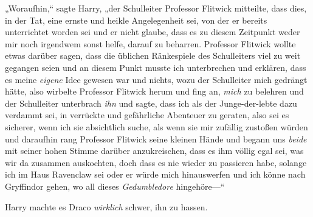 „Woraufhin,“ sagte Harry, „der Schulleiter Professor Flitwick mitteilte, dass dies, in der Tat, eine ernste und heikle Angelegenheit sei, von der er bereits unterrichtet worden sei und er nicht glaube, dass es zu diesem Zeitpunkt weder mir noch irgendwem sonst helfe, darauf zu beharren. Professor Flitwick wollte etwas darüber sagen, dass die üblichen Ränkespiele des Schulleiters viel zu weit gegangen seien und an diesem Punkt musste ich unterbrechen und erklären, dass es meine \emph{eigene} Idee gewesen war und nichts, wozu der Schulleiter mich gedrängt hätte, also wirbelte Professor Flitwick herum und fing an, \emph{mich} zu belehren und der Schulleiter unterbrach \emph{ihn} und sagte, dass ich als der Junge-der-lebte dazu verdammt sei, in verrückte und gefährliche Abenteuer zu geraten, also sei es sicherer, wenn ich sie absichtlich suche, als wenn sie mir zufällig zustoßen würden und daraufhin rang Professor Flitwick seine kleinen Hände und begann uns \emph{beide} mit seiner hohen Stimme darüber anzukreischen, dass es ihm völlig egal sei, was wir da zusammen auskochten, doch dass es nie wieder zu passieren habe, solange ich im Haus Ravenclaw sei oder er würde mich hinauswerfen und ich könne nach Gryffindor gehen, wo all dieses \emph{Gedumbledore} hingehöre—“

Harry machte es Draco \emph{wirklich} schwer, ihn zu hassen.


